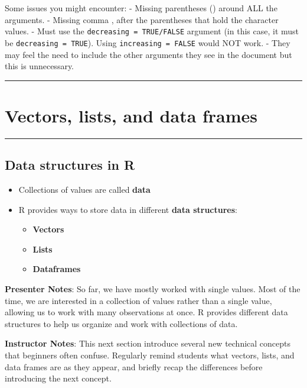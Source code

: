 \documentclass[
  letterpaper,
  DIV=11,
  numbers=noendperiod]{scrartcl}
\providecommand{\tightlist}{%
  \setlength{\itemsep}{0pt}\setlength{\parskip}{0pt}}
\begin{document}
Some issues you might encounter: - Missing parentheses () around ALL the
arguments. - Missing comma , after the parentheses that hold the
character values. - Must use the \texttt{decreasing\ =\ TRUE/FALSE}
argument (in this case, it must be \texttt{decreasing\ =\ TRUE}). Using
\texttt{increasing\ =\ FALSE} would NOT work. - They may feel the need
to include the other arguments they see in the document but this is
unnecessary.

\begin{center}\rule{0.5\linewidth}{0.5pt}\end{center}

\section{Vectors, lists, and data
frames}\label{vectors-lists-and-data-frames}

\begin{center}\rule{0.5\linewidth}{0.5pt}\end{center}

\subsection{Data structures in R}\label{data-structures-in-r}

\begin{itemize}
\item
  Collections of values are called \textbf{data}
\item
  R provides ways to store data in different \textbf{data structures}:

  \begin{itemize}
  \tightlist
  \item
    \textbf{Vectors}
  \item
    \textbf{Lists}
  \item
    \textbf{Dataframes}
  \end{itemize}
\end{itemize}

\textbf{Presenter Notes}: So far, we have mostly worked with single
values. Most of the time, we are interested in a collection of values
rather than a single value, allowing us to work with many observations
at once. R provides different data structures to help us organize and
work with collections of data.

\textbf{Instructor Notes}: This next section introduce several new
technical concepts that beginners often confuse. Regularly remind
students what vectors, lists, and data frames are as they appear, and
briefly recap the differences before introducing the next concept.
\end{document}
